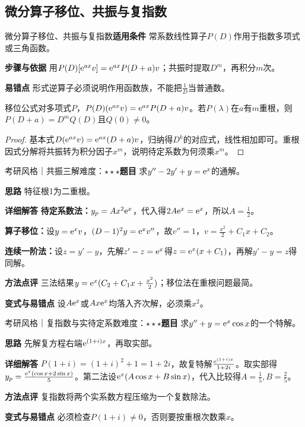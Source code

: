 \subsection{微分算子移位、共振与复指数}\label{deep:ode_source_deep:operator}

\begin{method}{微分算子移位、共振与复指数}\textbf{适用条件} 常系数线性算子$P(D)$作用于指数多项式或三角函数。\par\textbf{步骤与依据} 用$P(D)[\mathrm{e}^{ax}v]=\mathrm{e}^{ax}P(D+a)v$；共振时提取$D^m$，再积分$m$次。\par\textbf{易错点} 形式逆算子必须说明作用函数族，不能把$\frac{1}{D}$当普通数。\end{method}

\begin{theorem}{移位公式}对多项式$P$，$P(D)(\mathrm{e}^{ax}v)=\mathrm{e}^{ax}P(D+a)v$。若$P(\lambda)$在$a$有$m$重根，则$P(D+a)=D^mQ(D)$且$Q(0)\ne0$。\end{theorem}\begin{proof}基本式$D(\mathrm{e}^{ax}v)=\mathrm{e}^{ax}(D+a)v$，归纳得$D^k$的对应式，线性相加即可。重根因式分解将共振转为积分因子$x^m$，说明待定系数为何须乘$x^m$。\end{proof}

\begin{example}{考研风格｜共振三解}{难度：$\star\star\star$}\label{deep:ex:ode_source_deep:resonance}\textbf{题目} 求$y''-2y'+y=\mathrm{e}^x$的通解。\par\textbf{思路} 特征根1为二重根。\par\textbf{详细解答} \textbf{待定系数法：}$y_p=Ax^2\mathrm{e}^x$，代入得$2A\mathrm{e}^x=\mathrm{e}^x$，所以$A=\frac{1}{2}$。\par\textbf{算子移位：}设$y=\mathrm{e}^xv$，$(D-1)^2y=\mathrm{e}^xv''$，故$v''=1$，$v=\frac{x^2}{2}+C_1x+C_2$。\par\textbf{连续一阶法：}设$z=y'-y$，先解$z'-z=\mathrm{e}^x$得$z=\mathrm{e}^x(x+C_1)$，再解$y'-y=z$得同解。\par\textbf{方法点评} 三法结果$y=\mathrm{e}^x(C_2+C_1x+\frac{x^2}{2})$；移位法在重根问题最简。\par\textbf{变式与易错点} 设$A\mathrm{e}^x$或$Ax\mathrm{e}^x$均落入齐次解，必须乘$x^2$。\end{example}

\begin{example}{考研风格｜复指数与实待定系数}{难度：$\star\star\star$}\label{deep:ex:ode_source_deep:complexforce}\textbf{题目} 求$y''+y=\mathrm{e}^x\cos x$的一个特解。\par\textbf{思路} 先解复方程右端$\mathrm{e}^{(1+i)x}$，再取实部。\par\textbf{详细解答} $P(1+i)=(1+i)^2+1=1+2i$，故复特解$\frac{\mathrm{e}^{(1+i)x}}{1+2i}$。取实部得$y_p=\frac{\mathrm{e}^x(\cos x+2\sin x)}{5}$。第二法设$\mathrm{e}^x(A\cos x+B\sin x)$，代入比较得$A=\frac{1}{5},B=\frac{2}{5}$。\par\textbf{方法点评} 复指数将两个实系数方程压缩为一个复数除法。\par\textbf{变式与易错点} 必须检查$P(1+i)\ne0$，否则要按重根次数乘$x$。\end{example}

